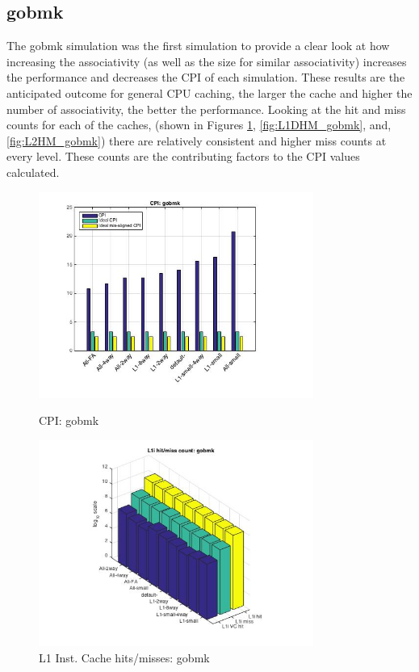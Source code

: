 \documentclass[11pt,titlepage]{article}
\begin{document}
    \subsection{gobmk}
    The gobmk simulation was the first simulation to provide a clear look at how increasing the associativity (as well as the size for similar associativity) increases the performance and decreases the CPI of each simulation. These results are the anticipated outcome for general CPU caching, the larger the cache and higher the number of associativity, the better the performance. Looking at the hit and miss counts for each of the caches, (shown in Figures \ref{fig:L1IHM_gobmk}, \ref{fig:L1DHM_gobmk}, and, \ref{fig:L2HM_gobmk}) there are relatively consistent and higher miss counts at every level. These counts are the contributing factors to the CPI values calculated.
    \begin{figure}[H]
          \centering
          \begin{minipage}{.5\textwidth}
            \centering
            \includegraphics[width=9cm]{CPIgobmk}
            \caption{CPI: gobmk}
            \label{fig:CPIgobmk}
          \end{minipage}%
          \begin{minipage}{.5\textwidth}
            \includegraphics[width=9cm]{L1IHM_gobmk}
            \caption{L1 Inst. Cache hits/misses: gobmk}
            \label{fig:L1IHM_gobmk}
          \end{minipage}%
    \end{figure}
\end{document}
